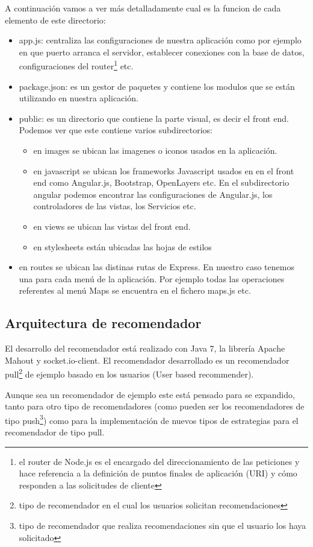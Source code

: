 A continuación vamos a ver más detalladamente cual es la funcion de cada elemento de este directorio:
\begin{itemize}
	\item app.js: centraliza las configuraciones de nuestra aplicación como por ejemplo en que puerto arranca el servidor, establecer conexiones con la base de datos, configuraciones del router\footnote{el router de Node.js es el encargado del direccionamiento de las peticiones y hace referencia a la definición de puntos finales de aplicación (URI) y cómo responden a las solicitudes de cliente} etc.
	\item package.json: es un gestor de paquetes y contiene los modulos que se están utilizando en nuestra aplicación.
	\item public: es un directorio que contiene la parte visual, es decir el front end. Podemos ver que este contiene varios subdirectorios:
	\begin{itemize}
	\item en images se ubican las imagenes o iconos usados en la aplicación.
	\item en javascript se ubican los frameworks Javascript usados en en el front end como Angular.js, Bootstrap, OpenLayers etc. En el subdirectorio angular podemos encontrar las configuraciones de Angular.js, los controladores de las vistas, los Servicios etc.
	\item en views se ubican las vistas del front end.
	\item en stylesheets están ubicadas las hojas de estilos
	\end{itemize}
	\item en routes se ubican las distinas rutas de Express. En nuestro caso tenemos una para cada menú de la aplicación. Por ejemplo todas las operaciones referentes al menú Maps se encuentra en el fichero maps.js etc.
\end{itemize}

\subsection{Arquitectura de recomendador}


El desarrollo del recomendador está realizado con Java 7, la librería Apache Mahout y socket.io-client. El recomendador desarrollado es un recomendador pull\footnote{tipo de recomendador en el cual los usuarios solicitan recomendaciones} de ejemplo basado en los usuarios (User based recommender). 

Aunque sea un recomendador de ejemplo este está pensado para se expandido, tanto para otro tipo de recomendadores (como pueden ser los recomendadores de tipo push\footnote{tipo de recomendador que realiza recomendaciones sin que el usuario los haya solicitado}) como para la implementación de nuevos tipos de estrategias para el recomendador de tipo pull.

